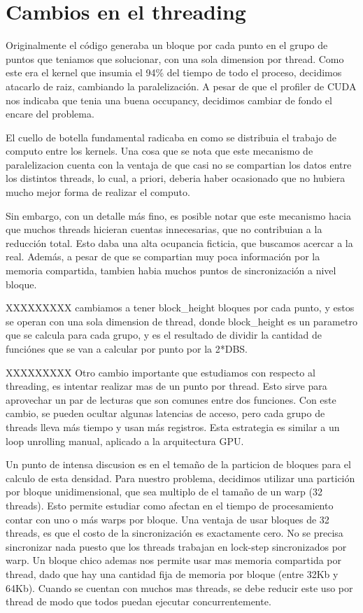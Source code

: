 \section{Cambios en el threading}
Originalmente el c\'odigo generaba un bloque por cada punto en el grupo de puntos
que teniamos que solucionar, con una sola dimension por thread.
Como este era el kernel que insumia el 94\% del tiempo de todo el proceso, decidimos
atacarlo de raiz, cambiando la paralelizaci\'on. A pesar de que el profiler de CUDA nos indicaba
que tenia una buena occupancy, decidimos cambiar de fondo el encare del problema.

El cuello de botella fundamental radicaba en como se distribuia el trabajo de computo
entre los kernels. Una cosa que se nota que este mecanismo de paralelizacion cuenta con
la ventaja de que casi no se compartian los datos entre los distintos threads, lo cual,
a priori, deberia haber ocasionado que no hubiera mucho mejor forma de realizar el computo.

Sin embargo, con un detalle m\'as fino, es posible notar que este mecanismo hacia que
muchos threads hicieran cuentas innecesarias, que no contribuian a la reducci\'on total.
Esto daba una alta ocupancia ficticia, que buscamos acercar a la real. Adem\'as, a pesar
de que se compartian muy poca informaci\'on por la memoria compartida, tambien habia muchos
puntos de sincronización a nivel bloque.

XXXXXXXXX cambiamos a tener block\_height bloques por cada punto, y estos se operan
con una sola dimension de thread, donde block\_height es un parametro que se calcula
para cada grupo, y es el resultado de dividir la cantidad de funci\'ones que se van
a calcular por punto por la 2*DBS.

XXXXXXXXX Otro cambio importante que estudiamos con respecto al threading, es intentar realizar
mas de un punto por thread. Esto sirve para aprovechar un par de lecturas que son comunes
entre dos funciones. Con este cambio, se pueden ocultar algunas latencias de acceso, pero
cada grupo de threads lleva m\'as tiempo y usan m\'as registros. Esta estrategia es similar
a un loop unrolling manual, aplicado a la arquitectura GPU.

Un punto de intensa discusion es en el tema\~no de la particion de bloques para el calculo
de esta densidad. Para nuestro problema, decidimos utilizar una partici\'on por bloque
unidimensional, que sea multiplo de el tama\~no de un warp (32 threads). Esto permite
estudiar como afectan en el tiempo de procesamiento contar con uno o m\'as warps por
bloque. Una ventaja de usar bloques de 32 threads, es que el costo de la sincronizaci\'on
es exactamente cero. No se precisa sincronizar nada puesto que los threads trabajan
en lock-step sincronizados por warp. Un bloque chico ademas nos permite usar mas memoria compartida
por thread, dado que hay una cantidad fija de memoria por bloque (entre 32Kb y 64Kb).
Cuando se cuentan con muchos mas threads, se debe reducir este uso por thread de modo que
todos puedan ejecutar concurrentemente.

